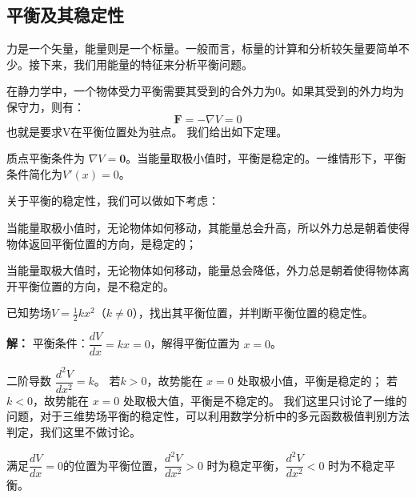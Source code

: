 \documentclass[UTF-8]{ctexart}
\begin{document}
\subsection{平衡及其稳定性}
力是一个矢量，能量则是一个标量。一般而言，标量的计算和分析较矢量要简单不少。接下来，我们用能量的特征来分析平衡问题。

在静力学中，一个物体受力平衡需要其受到的合外力为0。如果其受到的外力均为保守力，则有：
\[
\mathbf{F}=-\nabla V = 0
\]
也就是要求V在平衡位置处为驻点。
我们给出如下定理。
\begin{tcolorbox}[colback=white!5!white,colframe=green!50!black,title=平衡条件及其稳定性]
质点平衡条件为 \(\nabla V = \mathbf{0}\)。当能量取极小值时，平衡是稳定的。一维情形下，平衡条件简化为$V'(x) = 0$。
\end{tcolorbox}
关于平衡的稳定性，我们可以做如下考虑：

当能量取极小值时，无论物体如何移动，其能量总会升高，所以外力总是朝着使得物体返回平衡位置的方向，是稳定的；

当能量取极大值时，无论物体如何移动，能量总会降低，外力总是朝着使得物体离开平衡位置的方向，是不稳定的。
\begin{tcolorbox}[colback=white!5!white,colframe=green!50!black,title=例题]
已知势场$V =  \frac{1}{2}k x^2$（$k \neq 0$），找出其平衡位置，并判断平衡位置的稳定性。
\end{tcolorbox}
\noindent \textbf{解：}
平衡条件：$\dfrac{dV}{dx} = kx = 0$，解得平衡位置为 $x = 0$。

二阶导数 $\dfrac{d^2V}{dx^2} = k$。
若$k > 0$，故势能在 $x=0$ 处取极小值，平衡是稳定的；
若$k < 0$，故势能在 $x=0$ 处取极大值，平衡是不稳定的。
我们这里只讨论了一维的问题，对于三维势场平衡的稳定性，可以利用数学分析中的多元函数极值判别方法判定，我们这里不做讨论。
\begin{tcolorbox}[colback=white!5!white, colframe=red!75!black, title=平衡及其稳定性小结]
满足$\dfrac{dV}{dx} =0$的位置为平衡位置，$\dfrac{d^2V}{dx^2} >0$ 时为稳定平衡，$\dfrac{d^2V}{dx^2}<0 $ 时为不稳定平衡。
\end{tcolorbox}
\end{document}
